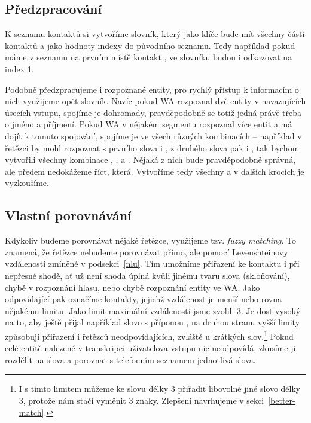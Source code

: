 \subsection{Předzpracování}

K seznamu kontaktů si vytvoříme slovník,
který jako klíče bude mít všechny části kontaktů a jako hodnoty indexy do původního
seznamu. Tedy například pokud máme v seznamu na prvním místě kontakt ,
ve slovníku budou  i  odkazovat na index 1.

Podobně předzpracujeme i rozpoznané entity, pro rychlý přístup k informacím o nich
využijeme opět slovník. Navíc pokud WA rozpoznal dvě entity v navazujících úsecích vstupu,
spojíme je dohromady, pravděpodobně se totiž jedná právě třeba o jméno a příjmení.
Pokud WA v nějakém segmentu rozpoznal více entit a má dojít k tomuto spojování, spojíme
je ve všech různých kombinacích -- například v řetězci  by mohl
rozpoznat s prvního slova  i , z druhého slova pak  i
, tak bychom vytvořili všechny kombinace , ,
 a . Nějaká z nich bude pravděpodobně správná, ale
předem nedokážeme říct, která. Vytvoříme tedy všechny a v dalších krocích
je vyzkoušíme.

\subsection{Vlastní porovnávání}\label{subsection-matching}

Kdykoliv budeme porovnávat nějaké řetězce, využijeme tzv. \textit{fuzzy matching}.
To znamená, že řetězce nebudeme porovnávat přímo, ale pomocí Levenshteinovy vzdálenosti
zmíněné v podsekci~\ref{nlu}. Tím umožníme přiřazení ke kontaktu i při nepřesné shodě,
ať už není shoda úplná kvůli jinému tvaru slova (skloňování), chybě v rozpoznání
hlasu, nebo chybě rozpoznání entity ve WA. Jako odpovídající pak označíme kontakty,
jejichž vzdálenost je menší nebo rovna nějakému limitu. Jako limit maximální vzdálenosti
jsme zvolili 3. Je dost vysoký na to, aby ještě přijal například slovo s příponou
, na druhou stranu vyšší limity způsobují přiřazení i řetězců neodpovídajících,
zvláště u krátkých slov.\footnote{I s tímto limitem můžeme ke slovu délky 3 přiřadit libovolné jiné
    slovo délky 3, protože nám stačí vyměnit 3 znaky. Zlepšení navrhujeme v sekci~\ref{better-match}.}
Pokud celé entitě nalezené v transkripci uživatelova vstupu nic neodpovídá,
zkusíme ji rozdělit na slova a porovnat s telefonním seznamem jednotlivá slova.

